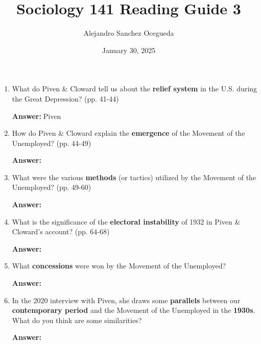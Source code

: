 \documentclass{article}
\title{Sociology 141 Reading Guide 3}
\author{Alejandro Sanchez Ocegueda}
\date{January 30, 2025}
\newcommand{\answer}{\textbf{Answer:}$\;$}
\begin{document}
\maketitle

\begin{enumerate}[label=\arabic*)]
    \item What do Piven \& Cloward tell us about the \textbf{relief system} in the U.S. during the Great Depression? (pp. 41-44)

    \answer Piven

    \item How do Piven \& Cloward explain the \textbf{emergence} of the Movement of the Unemployed? (pp. 44-49)

    \answer 

    \item What were the various \textbf{methods} (or tactics) utilized by the Movement of the Unemployed? (pp. 49-60)

    \answer

    \item What is the significance of the \textbf{electoral instability} of 1932 in Piven \& Cloward's account? (pp. 64-68)

    \answer

    \item What \textbf{concessions} were won by the Movement of the Unemployed?

    \answer

    \item In the 2020 interview with Piven, she draws some \textbf{parallels} between our \textbf{contemporary period} and the Movement of the Unemployed in the \textbf{1930s}.
    What do you think are some similarities?

    \answer
    
\end{enumerate}
 
\end{document}
